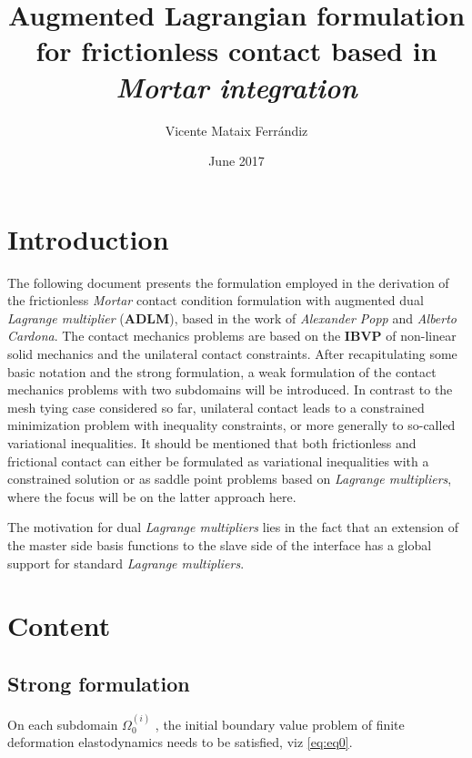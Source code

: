 \documentclass[a4paper,10pt]{article} %
\title{Augmented Lagrangian formulation for frictionless contact based in \em{Mortar} integration}
\author{Vicente Mataix Ferr\'andiz}
\date{June 2017}
\begin{document}
\maketitle

\section{Introduction}

The following document presents the formulation employed in the derivation of the frictionless \textit{Mortar} contact condition formulation with augmented dual \textit{Lagrange multiplier} (\textbf{ADLM}), based in the work of \textit{Alexander Popp}\cite{popp1,popp2} and \textit{Alberto Cardona}\cite{cardona1,cardona2}. The contact mechanics problems are based on the \textbf{IBVP} of non-linear solid mechanics and the unilateral contact constraints. After recapitulating some basic notation and the strong formulation, a weak formulation of the contact mechanics problems with two subdomains will be introduced.  In contrast to the mesh tying case considered so far, unilateral contact leads to a constrained minimization problem with inequality constraints, or more generally to so-called variational inequalities. It should be mentioned that both frictionless and frictional contact can either be formulated as variational inequalities with
a constrained solution or as saddle point problems based on \textit{Lagrange multipliers}, where the focus will be on the latter approach here. 

The motivation for dual \textit{Lagrange multipliers}\cite{wohlmuth} lies in the fact that an extension of the master side basis functions to the slave side of the interface has a global support for standard \textit{Lagrange multipliers}. 

\section{Content}

\subsection{Strong formulation}

On each subdomain $\Omega_0^{(i)}$ , the initial boundary value problem of finite deformation elastodynamics needs to be satisfied, viz \eqref{eq:eq0}.
\end{document}
